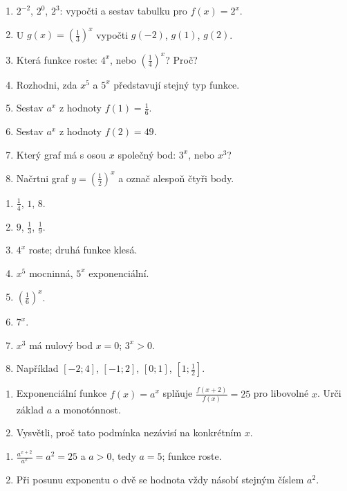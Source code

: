 \documentclass[11pt,a4paper]{article}
\begin{document}
\begin{zadaniReseniBox}[title={Samostatná práce 1}]
\begin{enumerate}[label=\alph*)]
\item $2^{-2}$, $2^0$, $2^3$: vypočti a sestav tabulku pro $f(x)=2^x$.
\item U $g(x)=\left(\frac{1}{3}\right)^x$ vypočti $g(-2)$, $g(1)$, $g(2)$.
\item Která funkce roste: $4^x$, nebo $\left(\frac{1}{4}\right)^x$? Proč?
\item Rozhodni, zda $x^5$ a $5^x$ představují stejný typ funkce.
\item Sestav $a^x$ z hodnoty $f(1)=\frac{1}{6}$.
\item Sestav $a^x$ z hodnoty $f(2)=49$.
\item Který graf má s osou $x$ společný bod: $3^x$, nebo $x^3$?
\item Načrtni graf $y=\left(\frac{1}{2}\right)^x$ a označ alespoň čtyři body.
\end{enumerate}
\tcblower
\begin{enumerate}[label=\alph*)]
\item $\frac{1}{4}$, $1$, $8$.
\item $9$, $\frac{1}{3}$, $\frac{1}{9}$.
\item $4^x$ roste; druhá funkce klesá.
\item $x^5$ mocninná, $5^x$ exponenciální.
\item $\left(\frac{1}{6}\right)^x$.
\item $7^x$.
\item $x^3$ má nulový bod $x=0$; $3^x>0$.
\item Například $[-2;4]$, $[-1;2]$, $[0;1]$, $[1;\frac{1}{2}]$.
\end{enumerate}
\end{zadaniReseniBox}
\begin{zadaniReseniBox}[title={Rozšíření 1}]
\begin{enumerate}[label=\alph*)]
\item Exponenciální funkce $f(x)=a^x$ splňuje $\frac{f(x+2)}{f(x)}=25$ pro libovolné $x$. Urči základ $a$ a monotónnost.
\item Vysvětli, proč tato podmínka nezávisí na konkrétním $x$.
\end{enumerate}
\tcblower
\begin{enumerate}[label=\alph*)]
\item $\frac{a^{x+2}}{a^x}=a^2=25$ a $a>0$, tedy $a=5$; funkce roste.
\item Při posunu exponentu o dvě se hodnota vždy násobí stejným číslem $a^2$.
\end{enumerate}
\end{zadaniReseniBox}
\end{document}
